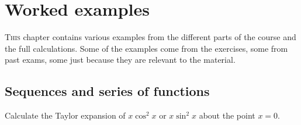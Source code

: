 \chapter{Worked examples}

\lettrine{T}{his} chapter contains various examples from the different parts of the course and the full calculations.
Some of the examples come from the exercises, some from past exams, some just because they are relevant to the material.

\section{Sequences and series of functions}

\begin{task}
    Calculate the Taylor expansion of
    $x\cos^2 x$ or $x\sin^2 x$
    about the point $x=0$.
\end{task}

